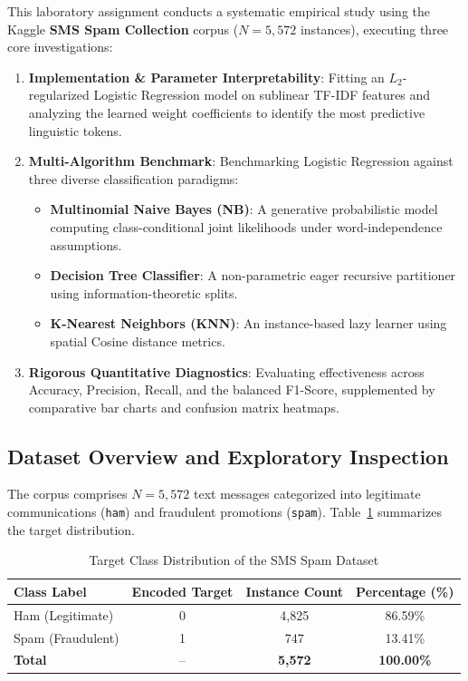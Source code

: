 \documentclass[12pt]{article}
\begin{document}
This laboratory assignment conducts a systematic empirical study using the Kaggle \textbf{SMS Spam Collection} corpus ($N = 5,572$ instances), executing three core investigations:
\begin{enumerate}
    \item \textbf{Implementation & Parameter Interpretability}: Fitting an $L_2$-regularized Logistic Regression model on sublinear TF-IDF features and analyzing the learned weight coefficients to identify the most predictive linguistic tokens.
    \item \textbf{Multi-Algorithm Benchmark}: Benchmarking Logistic Regression against three diverse classification paradigms:
    \begin{itemize}
        \item \textbf{Multinomial Naive Bayes (NB)}: A generative probabilistic model computing class-conditional joint likelihoods under word-independence assumptions.
        \item \textbf{Decision Tree Classifier}: A non-parametric eager recursive partitioner using information-theoretic splits.
        \item \textbf{K-Nearest Neighbors (KNN)}: An instance-based lazy learner using spatial Cosine distance metrics.
    \end{itemize}
    \item \textbf{Rigorous Quantitative Diagnostics}: Evaluating effectiveness across Accuracy, Precision, Recall, and the balanced F1-Score, supplemented by comparative bar charts and confusion matrix heatmaps.
\end{enumerate}

\subsection{Dataset Overview and Exploratory Inspection}
The corpus comprises $N = 5,572$ text messages categorized into legitimate communications (\texttt{ham}) and fraudulent promotions (\texttt{spam}). Table~\ref{tab:dataset_dist} summarizes the target distribution.

\begin{table}[H]
\centering
\caption{Target Class Distribution of the SMS Spam Dataset}
\label{tab:dataset_dist}
\vspace{0.2cm}
\begin{tabular}{lccc}
\toprule
\textbf{Class Label} & \textbf{Encoded Target} & \textbf{Instance Count} & \textbf{Percentage (\%)} \\
\midrule
Ham (Legitimate) & 0 & 4,825 & 86.59\% \\
Spam (Fraudulent) & 1 & 747 & 13.41\% \\
\midrule
\textbf{Total} & -- & \textbf{5,572} & \textbf{100.00\%} \\
\bottomrule
\end{tabular}
\end{table}
\end{document}
